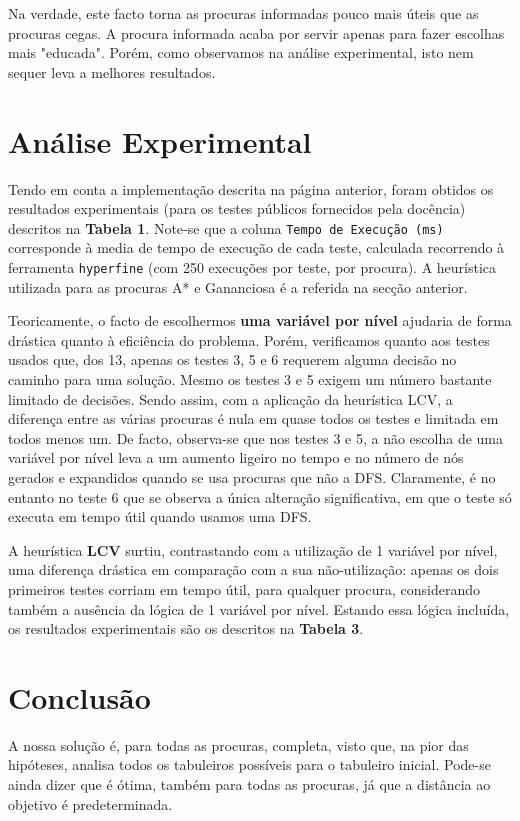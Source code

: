 \documentclass[12pt,a4paper]{article}
\begin{document}
Na verdade, este facto torna as procuras informadas pouco mais úteis que as procuras cegas.
A procura informada acaba por servir apenas para fazer escolhas mais "educada".
Porém, como observamos na análise experimental, isto nem sequer leva a melhores resultados.

\section*{Análise Experimental}

Tendo em conta a implementação descrita na página anterior, foram obtidos os resultados experimentais (para os testes públicos fornecidos pela docência) descritos na \textbf{Tabela 1}.
 Note-se que a coluna \texttt{Tempo de Execução (ms)} corresponde à media de tempo de execução de cada teste, calculada recorrendo à ferramenta \texttt{hyperfine} (com 250 execuções por teste, por procura).
 A heurística utilizada para as procuras A* e Gananciosa é a referida na secção anterior.

Teoricamente, o facto de escolhermos \textbf{uma variável por nível} ajudaria de forma drástica quanto à eficiência do problema.
Porém, verificamos quanto aos testes usados que, dos 13, apenas os testes 3, 5 e 6 requerem alguma decisão no caminho para uma solução.
Mesmo os testes 3 e 5 exigem um número bastante limitado de decisões.
Sendo assim, com a aplicação da heurística LCV, a diferença entre as várias procuras é nula em quase todos os testes e limitada em todos menos um.
De facto, observa-se que nos testes 3 e 5, a não escolha de uma variável por nível leva a um aumento ligeiro no tempo e no número de nós gerados e expandidos quando se usa procuras que não a DFS.
Claramente, é no entanto no teste 6 que se observa a única alteração significativa, em que o teste só executa em tempo útil quando usamos uma DFS.

A heurística \textbf{LCV} surtiu, contrastando com a utilização de 1 variável por nível, uma diferença drástica em comparação com a sua não-utilização: apenas os dois primeiros testes corriam em tempo útil, para qualquer procura, considerando também a ausência da lógica de 1 variável por nível.
 Estando essa lógica incluída, os resultados experimentais são os descritos na \textbf{Tabela 3}.

\section*{Conclusão}

A nossa solução é, para todas as procuras, completa, visto que, na pior das hipóteses, analisa todos os tabuleiros possíveis para o tabuleiro inicial.
 Pode-se ainda dizer que é ótima, também para todas as procuras, já que a distância ao objetivo é predeterminada.
\end{document}
